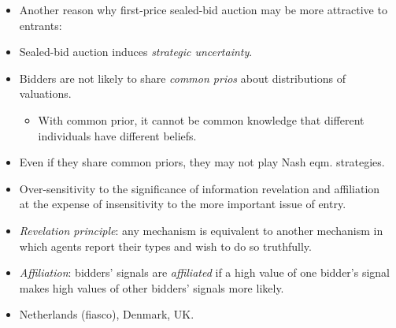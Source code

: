 \documentclass[uplatex,14pt,dvipdfmx,xcolor=svgnames]{beamer}
\begin{document}
\begin{frame}[t]{\ssecIIIa}
	
\begin{itemize}
	\item Another reason why first-price sealed-bid auction may be more attractive to entrants:
	\item Sealed-bid auction induces \emph{strategic uncertainty}.
	\vspace{3mm}
	\item Bidders are not likely to share \emph{common prios} about distributions of valuations.
	\begin{itemize}
		\item {\footnotesize With common prior, it cannot be common knowledge that different
		individuals have different beliefs.}
	\end{itemize}
	\item Even if they share common priors, they may not play Nash eqm. strategies.
\end{itemize}	
	
\end{frame}

\begin{frame}[t]{\ssecIIIa}
	
\begin{itemize}
	\item Over-sensitivity to the significance of information revelation and affiliation \\
		{\footnotesize at the expense of insensitivity to the more important issue of entry.}
	\item \emph{Revelation principle}: any mechanism is equivalent to another mechanism in which agents report their types and wish to do so truthfully.
	\item \emph{Affiliation}: bidders' signals are \textsl{affiliated} if a high value of one bidder's signal makes high values of other bidders' signals more likely.
	\item Netherlands (fiasco), Denmark, UK.
\end{itemize}	
	
\end{frame}

\newcommand{\ssecIIIb}{4.3.2 Collusion}
\end{document}
